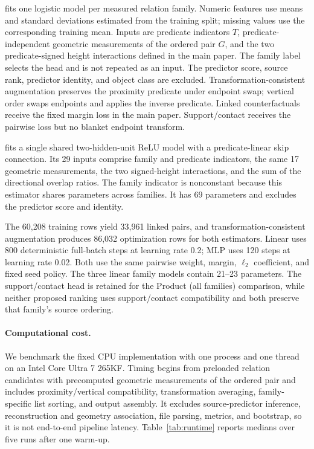 \methodlinear{} fits one logistic model per measured relation family. Numeric
features use means and standard deviations estimated from the training split;
missing values use the corresponding training mean. Inputs are predicate
indicators $T$, predicate-independent geometric measurements of the ordered pair $G$, and the
two predicate-signed height interactions defined in the main paper. The
family label selects the head and is not repeated as an input. The predictor
score, source rank, predictor identity, and object class are excluded.
Transformation-consistent augmentation preserves the proximity predicate
under endpoint swap; vertical order swaps endpoints and applies the inverse
predicate. Linked counterfactuals receive the fixed margin loss in the main
paper. Support/contact receives the pairwise loss but no blanket endpoint
transform.

\methodmlp{} fits a single shared two-hidden-unit ReLU model with a
predicate-linear skip connection. Its 29 inputs comprise family and predicate
indicators, the same 17 geometric measurements, the two signed-height
interactions, and the sum of the directional overlap ratios. The family
indicator is nonconstant because this estimator shares parameters across
families. It has 69 parameters and excludes the predictor score and identity.

The 60,208 training rows yield 33,961 linked pairs, and
transformation-consistent augmentation produces 86,032 optimization rows for
both estimators. Linear uses 800 deterministic full-batch steps at learning rate
0.2; MLP uses 120 steps at learning rate 0.02. Both use the same pairwise
weight, margin, $\ell_2$ coefficient, and fixed seed policy. The three linear
family models contain 21--23 parameters. The support/contact head is retained
for the Product (all families) comparison, while neither proposed ranking uses
support/contact compatibility and both preserve that family's source ordering.

\paragraph{Computational cost.}
We benchmark the fixed \methodlinear{} CPU implementation with one process and one thread on
an Intel Core Ultra 7 265KF. Timing begins from preloaded relation candidates with
precomputed geometric measurements of the ordered pair and includes proximity/vertical compatibility,
transformation averaging, family-specific list sorting, and output assembly. It excludes
source-predictor inference, reconstruction and geometry association, file parsing, metrics,
and bootstrap, so it is not end-to-end pipeline latency. Table~\ref{tab:runtime}
reports medians over five runs after one warm-up.

